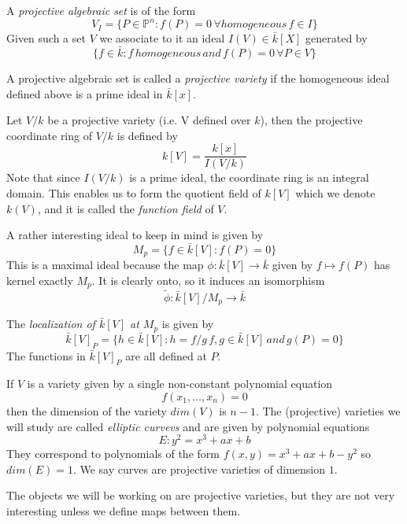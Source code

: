 \documentclass[a4paper,10pt]{amsart}
\begin{document}
\begin{mydef}
 A \emph{projective algebraic set} is of the form
$$ V_I = \{ P\in \mathbb{P}^n : f(P) = 0\, \forall homogeneous\, f\in I \} $$
Given such a set $V$ we associate to it an ideal $I(V) \in \bar{k}[X]$ generated by
$$ \{f\in\bar{k} : f\, homogeneous\, and\, f(P)=0\, \forall P\in V \} $$
\end{mydef}

\begin{mydef}
 A projective algebraic set is called a \emph{projective variety} if the homogeneous
ideal defined above is a prime ideal in $\bar{k}[x]$.
\end{mydef}

\begin{mydef}
 Let $V/k$ be a projective variety (i.e. V defined over $k$), then the projective coordinate
ring of $V/k$ is defined by
$$ k[V] = \frac{k[x]}{I(V/k)}$$
Note that since $I(V/k)$ is a prime ideal, the coordinate ring is an integral domain.
This enables us to form the quotient field of $k[V]$ which we denote $k(V)$, and it is called
the \emph{function field} of $V$.
\end{mydef}

A rather interesting ideal to keep in mind is given by
$$ M_p = \{ f\in \bar{k}[V] : f(P)=0 \} $$
This is a maximal ideal because the map $\phi: \bar{k}[V] \rightarrow \bar{k}$ given by
$ f \mapsto f(P) $ has kernel exactly $M_p$. It is clearly onto, so it induces an
isomorphism $$\tilde{\phi}: \bar{k}[V]/M_p \rightarrow \bar{k} $$

\begin{mydef}
 The \emph{localization of $\bar{k}[V]$ at $M_p$} is given by
$$ \bar{k}[V]_P = \{ h \in \bar{k}[V] : h = f/g\, f,g\in \bar{k}[V]\, and\, g(P)=0 \} $$
The functions in $\bar{k}[V]_P$ are all defined at $P$.
\end{mydef}

\begin{ex}
 If $V$ is a variety given by a single non-constant polynomial equation
$$f(x_1,\ldots,x_n) = 0$$ 
then the dimension of the variety $dim(V)$ is $n-1$. The (projective) varieties
we will study are called \emph{elliptic curvevs} and are
given by polynomial equations
$$E: y^2 = x^3+ax+b$$
They correspond to polynomials of the form $f(x,y) = x^3+ax+b-y^2$ so $dim(E)=1$.
We say curves are projective varieties of dimension $1$.
\end{ex}


The objects we will be working on are projective varieties, but they are not
very interesting unless we define maps between them.
\end{document}
